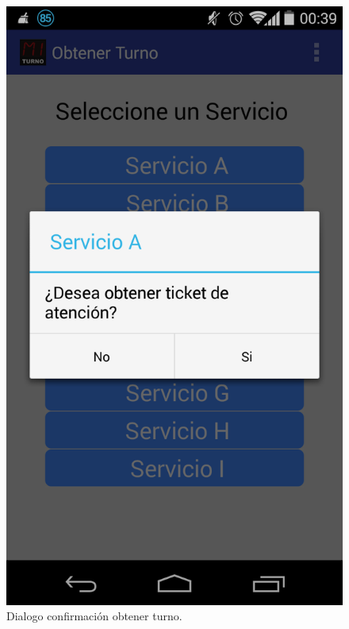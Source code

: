 \begin{figure}[H]
\centering
\includegraphics[scale=0.25]{images/capitulo5/dialogo.png}
\caption{Dialogo confirmación obtener turno.}
\label{dialogo}
\end{figure}

